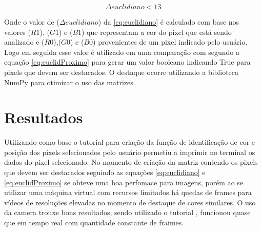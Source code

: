 \documentclass{bmvc2k}
\begin{document}
\begin{equation}
\label{eq:euclidProximo}	\Delta{euclidiano} < 13
\end{equation}

Onde o valor de ($\Delta{euclidiano}$) da \ref{eq:euclidiano} é calculado com base nos valores ($R{1}$), ($G{1}$) e ($B{1}$) que representam a cor do pixel que está sendo analizado e ($R{0}$),($G{0}$) e ($B{0}$) provenientes de um pixel indicado pelo usuário.
Logo em seguida esse valor é utilizado em uma comparação com segundo a equação \ref{eq:euclidProximo} para gerar um valor booleano indicando True para pixels que devem ser destacados.
O destaque ocorre utilizando a biblioteca NumPy \cite{[NumPy]} para otimizar o uso das matrizes.

\section{Resultados}
Utilizando como base o tutorial \cite{[PyImageSearch]} para criação da função de identificação de cor e posição dos pixels selecionados pelo usuário permetiu a imprimir no terminal os dados do pixel selecionado. No momento de criação da matriz contendo os pixels que devem ser destacados seguindo as equações \ref{eq:euclidiano} e \ref{eq:euclidProximo} se obteve uma boa perfomace para imagens, porém ao se utilizar uma máquina virtual com recursos limitados há quedas de frames para vídeos de resoluções elevadas no momento de destaque de cores similares.
O uso da camera trouxe bons resultados, sendo utilizado o tutorial \cite{[CameraTest]}, funcionou quase que em tempo real com quantidade constante de fraimes.
\end{document}
